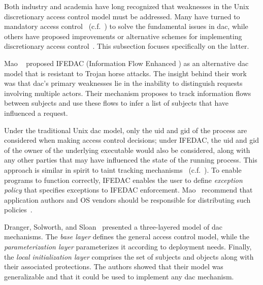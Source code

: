 \documentclass[
  fontsize=12pt,
  titlepage=firstiscover,
  paper=letter,
oneside,
  cleardoublepage=plain,
  parskip=half-,
  DIV=10,
  parindent,
  appendixprefix,
  chapterprefix,
  listof=totoc,
]{scrbook}
\begin{document}
Both industry and academia have long recognized that weaknesses in the Unix discretionary
access control model must be addressed. Many have turned to mandatory access
control~\cite{spencer1999_flask, smalley2001_selinux, wright2002_lsm, cowan2000_apparmor,
schaufler_smack, schreuders2012_towards, hu2013_fsf, harada2004_tomoyo, salaun_landlockio,
singh2019_krsi} (c.f.\ ) to solve the fundamental issues in \gls{dac}, while
others have proposed improvements or alternative schemes for implementing discretionary
access control~\cite{mao2009_trojan_resistant_dac, solworth2004_layered_dac,
dranger2006_dac_complexity, dittmer2014_setuid, tsafrir2008_setuid, chen2002_setuid}. This
subsection focuses specifically on the latter.

Mao \etal~\cite{mao2009_trojan_resistant_dac} proposed IFEDAC (Information Flow Enhanced
) as an alternative \gls{dac} model that is resistant to Trojan horse
attacks.  The insight behind their work was that \gls{dac}'s primary weaknesses lie in the
inability to distinguish requests involving multiple actors. Their mechanism proposes to
track information flows between subjects and use these flows to infer a list of subjects
that have influenced a request.

Under the traditional Unix \gls{dac} model, only the \gls{uid} and \gls{gid} of the
process are considered when making access control decisions; under IFEDAC, the \gls{uid}
and \gls{gid} of the owner of the underlying executable would also be considered, along
with any other parties that may have influenced the state of the running process. This
approach is similar in spirit to taint tracking mechanisms~\cite{livshits2012_dynamic}
(c.f.\ ). To enable programs to function correctly, IFEDAC enables
the user to define \textit{exception policy} that specifies exceptions to IFEDAC
enforcement. Mao \etal~recommend that application authors and OS vendors should be
responsible for distributing such policies~\cite{mao2009_trojan_resistant_dac}.

Dranger, Solworth, and Sloan~\cite{solworth2004_layered_dac, dranger2006_dac_complexity}
presented a three-layered model of \gls{dac} mechanisms. The \textit{base layer} defines
the general access control model, while the \textit{parameterization layer} parameterizes
it according to deployment needs.  Finally, the \textit{local initialization layer}
comprises the set of subjects and objects along with their associated protections. The
authors showed that their model was generalizable and that it could be used to implement
any \gls{dac} mechanism.
\end{document}
